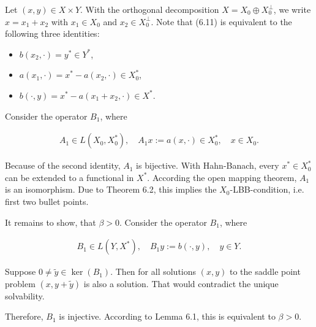 \begin{solution}
\begin{itemize}
  Let $(x, y) \in X \times Y$.
  With the orthogonal decomposition $X = X_0 \oplus X_0^\bot$, we write $x = x_1 + x_2$ with $x_1 \in X_0$ and $x_2 \in X_0^\bot$.
  Note that (6.11) is equivalent to the following three identities:

  \begin{itemize}
    \item $b(x_2, \cdot) = y^\ast \in Y^\ast$,
    \item $a(x_1, \cdot) = x^\ast - a(x_2, \cdot) \in X_0^\ast$,
    \item $b(\cdot, y)   = x^\ast - a(x_1 + x_2, \cdot) \in X^\ast$.
  \end{itemize}

  Consider the operator $B_1$, where

  \begin{align*}
    A_1 \in L(X_0, X_0^\ast),
    \quad
    A_1 x := a(x, \cdot) \in X_0^\ast,
    \quad
    x \in X_0.
  \end{align*}

  Because of the second identity, $A_1$ is bijective.
  With Hahn-Banach, every $x^\ast \in X_0^\ast$ can be extended to a functional in $X^\ast$.
  According the open mapping theorem, $A_1$ is an isomorphism.
  Due to Theorem 6.2, this implies the $X_0$-LBB-condition, i.e. first two bullet points.

  It remains to show, that $\beta > 0$.
  Consider the operator $B_1$, where

  \begin{align*}
    B_1 \in L(Y, X^\ast),
    \quad
    B_1 y := b(\cdot, y),
    \quad
    y \in Y.
  \end{align*}

  Suppose $0 \neq \tilde y \in \ker(B_1)$.
  Then for all solutions $(x, y)$ to the saddle point problem $(x, y + \tilde y)$ is also a solution.
  That would contradict the unique solvability.

  Therefore, $B_1$ is injective.
  According to Lemma 6.1, this is equivalent to $\beta > 0$.


\end{itemize}

\end{solution}

